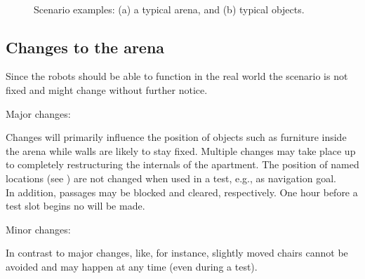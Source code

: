 \begin{figure}[tbp]
  \centering
   ~ 
  \caption{Scenario examples: (a) a typical arena, and (b) typical objects.}
  \label{fig:arena}
\end{figure}



\subsection{Changes to the arena}\label{rule:scenario_changes}

Since the robots should be able to function in the real world the
scenario is not fixed and might change without further notice.
\begin{enumerate}
{\bf\item Major changes:} Changes will primarily influence the position of 
  objects such as furniture inside the arena while walls are likely to stay fixed.
  Multiple changes may take place up to completely restructuring the internals of the apartment. 
  The position of named locations (see ) are not changed when used in a test, e.g., as navigation goal. \\
  In addition, passages may be blocked and cleared, respectively. 
  One hour before a test slot begins no  will be made.
{\bf\item Minor changes:} In contrast to major changes,  like, 
  for instance, slightly moved chairs cannot be avoided and may happen at any time (even during a test). 
\end{enumerate}


